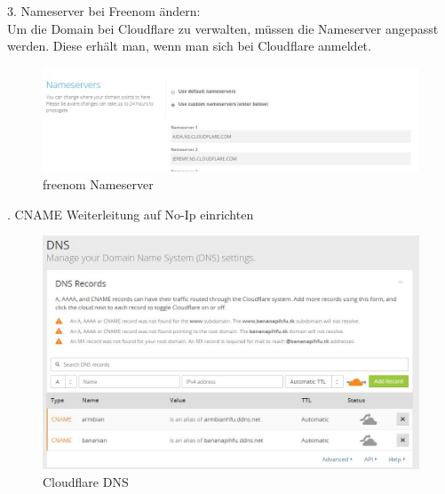 3. Nameserver bei Freenom ändern:\\
Um die Domain bei Cloudflare zu verwalten, müssen die Nameserver angepasst werden.
Diese erhält man, wenn man sich bei Cloudflare anmeldet.\\
\begin{figure}[ht]
\includegraphics[width=\textwidth]{pictures/Jonas/freenom_Nameserver}
\caption{freenom Nameserver}
\end{figure}
. CNAME Weiterleitung auf No-Ip einrichten\\
\begin{figure}[ht]
\includegraphics[width=\textwidth]{pictures/Jonas/Cloudflare_DNS}
\caption{Cloudflare DNS}
\end{figure}


